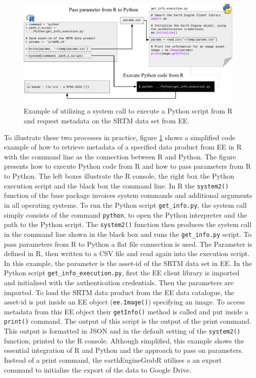 \begin{center}
	\begin{figure}[h]
		\begin{center}
			\includegraphics[width=15cm]{images/concole_connection_big-cropped.pdf}
			\caption{Example of utilizing a system call to execute a Python script from R and request metadata on the SRTM data set from EE.}
			\label{consoleConnection}			
		\end{center}
	\end{figure}
\end{center}


To illustrate these two processes in practice, figure \ref{consoleConnection} shows a simplified code example of how to retrieve metadata of a specified data product from EE in R with the command line as the connection between R and Python. The figure presents how to execute Python code from R and how to pass parameters from R to Python. The left boxes illustrate the R console, the right box the Python execution script and the black box the command line.
In R the \texttt{system2()} function of the base package invoices system commands and additional arguments in all operating systems. 
To run the Python script \texttt{get\_info.py}, the system call simply consists of the command \texttt{python}, to open the Python interpreter and the path to the Python script. The \texttt{system2()} function then produces the system call in the command line shown in the black box and runs the \texttt{get\_info.py} script. To pass parameters from R to Python a flat file connection is used. The Parameter is defined in R, then written to a CSV file and read again into the execution script. In this example, the parameter is the asset-id of the SRTM data set in EE. 
In the Python script \texttt{get\_info\_execution.py}, first the EE client library is imported and initialised with the authentication credentials. Then the parameters are imported. To load the SRTM data product from the EE data catalogue, the asset-id is put inside an EE object (\texttt{ee.Image()}) specifying an image. To access metadata from this EE object their \texttt{getInfo()} method is called and put inside a \texttt{print()} command. The output of this script is the output of the print command. This output is formatted in JSON and in the default setting of the \texttt{system2()} function, printed to the R console. Although simplified, this example shows the essential integration of R and Python and the approach to pass on parameters. 
Instead of a print command, the earthEngineGrabR utilises a an export command to initialize the export of the data to Google Drive.

